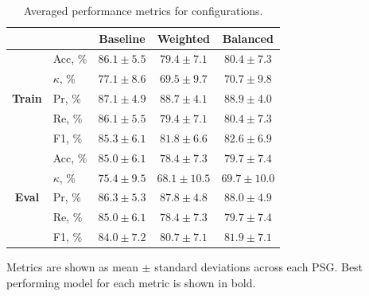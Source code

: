 \begin{table}
    \small
    \centering
    \begin{threeparttable}
    \caption[\acs{MASSC} train and validation performance, \acs{WSC}]{Averaged performance metrics for configurations.}%
    \label{tab:sleep-stages:train_eval_performance}
    \begin{tabular}{@{}clccc@{}}
        \toprule
                              &          & \textbf{Baseline}          & \textbf{Weighted}          & \textbf{Balanced}          \\ \midrule
        \multirow{5}{*}{\textbf{Train}} & Acc, \%      & $ \mathbf{86.1 \pm 5.5} $ & $ 79.4 \pm 7.1 $ & $ 80.4 \pm 7.3 $ \\
                              & $\kappa$, \% & $ \mathbf{77.1 \pm 8.6} $ & $ 69.5 \pm 9.7 $ & $ 70.7 \pm 9.8 $ \\
                              & Pr, \%       & $ 87.1 \pm 4.9 $ & $ 88.7 \pm 4.1 $ & $ \mathbf{88.9 \pm 4.0} $ \\
                              & Re, \%       & $ \mathbf{86.1 \pm 5.5} $ & $ 79.4 \pm 7.1 $ & $ 80.4 \pm 7.3 $ \\
                              & F1, \%       & $ \mathbf{85.3 \pm 6.1} $ & $ 81.8 \pm 6.6 $ & $ 82.6 \pm 6.9 $ \\ \midrule
        \multirow{5}{*}{\textbf{Eval}}  & Acc, \%      & $ \mathbf{85.0 \pm 6.1} $ & $ 78.4 \pm 7.3 $ & $ 79.7 \pm 7.4 $ \\
                              & $\kappa$, \% & $ \mathbf{75.4 \pm 9.5} $ & $ 68.1 \pm 10.5 $ & $ 69.7 \pm 10.0 $ \\
                              & Pr, \%       & $ 86.3 \pm 5.3 $ & $ 87.8 \pm 4.8 $ & $ \mathbf{88.0 \pm 4.9} $ \\
                              & Re, \%       & $ \mathbf{85.0 \pm 6.1} $ & $ 78.4 \pm 7.3 $ & $ 79.7 \pm 7.4 $ \\
                              & F1, \%       & $ \mathbf{84.0 \pm 7.2} $ & $ 80.7 \pm 7.1 $ & $ 81.9 \pm 7.1 $ \\ \bottomrule
    \end{tabular}
    \begin{tablenotes}
    \item Metrics are shown as mean \(\pm\) standard deviations across each \ac{PSG}. Best performing model for each metric is shown in bold.
    \end{tablenotes}
    \end{threeparttable}
\end{table}

